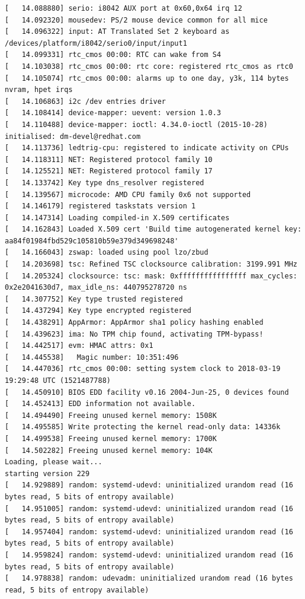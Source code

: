 \documentclass[12pt]{article}
\begin{document}
\begin{verbatim}
[   14.088880] serio: i8042 AUX port at 0x60,0x64 irq 12
[   14.092320] mousedev: PS/2 mouse device common for all mice
[   14.096322] input: AT Translated Set 2 keyboard as /devices/platform/i8042/serio0/input/input1
[   14.099331] rtc_cmos 00:00: RTC can wake from S4
[   14.103038] rtc_cmos 00:00: rtc core: registered rtc_cmos as rtc0
[   14.105074] rtc_cmos 00:00: alarms up to one day, y3k, 114 bytes nvram, hpet irqs
[   14.106863] i2c /dev entries driver
[   14.108414] device-mapper: uevent: version 1.0.3
[   14.110488] device-mapper: ioctl: 4.34.0-ioctl (2015-10-28) initialised: dm-devel@redhat.com
[   14.113736] ledtrig-cpu: registered to indicate activity on CPUs
[   14.118311] NET: Registered protocol family 10
[   14.125521] NET: Registered protocol family 17
[   14.133742] Key type dns_resolver registered
[   14.139567] microcode: AMD CPU family 0x6 not supported
[   14.146179] registered taskstats version 1
[   14.147314] Loading compiled-in X.509 certificates
[   14.162843] Loaded X.509 cert 'Build time autogenerated kernel key: aa84f01984fbd529c105810b59e379d349698248'
[   14.166043] zswap: loaded using pool lzo/zbud
[   14.203698] tsc: Refined TSC clocksource calibration: 3199.991 MHz
[   14.205324] clocksource: tsc: mask: 0xffffffffffffffff max_cycles: 0x2e2041630d7, max_idle_ns: 440795278720 ns
[   14.307752] Key type trusted registered
[   14.437294] Key type encrypted registered
[   14.438291] AppArmor: AppArmor sha1 policy hashing enabled
[   14.439623] ima: No TPM chip found, activating TPM-bypass!
[   14.442517] evm: HMAC attrs: 0x1
[   14.445538]   Magic number: 10:351:496
[   14.447036] rtc_cmos 00:00: setting system clock to 2018-03-19 19:29:48 UTC (1521487788)
[   14.450910] BIOS EDD facility v0.16 2004-Jun-25, 0 devices found
[   14.452413] EDD information not available.
[   14.494490] Freeing unused kernel memory: 1508K
[   14.495585] Write protecting the kernel read-only data: 14336k
[   14.499538] Freeing unused kernel memory: 1700K
[   14.502282] Freeing unused kernel memory: 104K
Loading, please wait...
starting version 229
[   14.929889] random: systemd-udevd: uninitialized urandom read (16 bytes read, 5 bits of entropy available)
[   14.951005] random: systemd-udevd: uninitialized urandom read (16 bytes read, 5 bits of entropy available)
[   14.957404] random: systemd-udevd: uninitialized urandom read (16 bytes read, 5 bits of entropy available)
[   14.959824] random: systemd-udevd: uninitialized urandom read (16 bytes read, 5 bits of entropy available)
[   14.978838] random: udevadm: uninitialized urandom read (16 bytes read, 5 bits of entropy available)

\end{verbatim}
\end{document}
